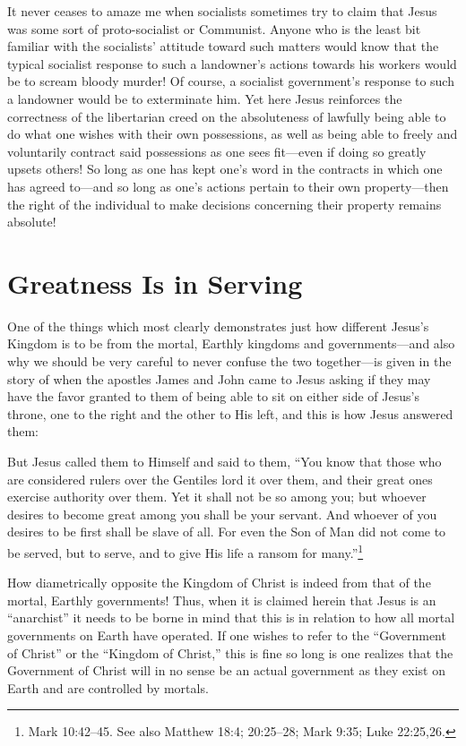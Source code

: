 \documentclass[letterpaper,12pt]{article}
\newenvironment{squote}
  {\small\quote}
  {\endquote\normalsize}
\begin{document}
It never ceases to amaze me when socialists sometimes try to claim that Jesus was some sort of proto-socialist or Communist. Anyone who is the least bit familiar with the socialists' attitude toward such matters would know that the typical socialist response to such a landowner's actions towards his workers would be to scream bloody murder! Of course, a socialist government's response to such a landowner would be to exterminate him. Yet here Jesus reinforces the correctness of the libertarian creed on the absoluteness of lawfully being able to do what one wishes with their own possessions, as well as being able to freely and voluntarily contract said possessions as one sees fit---even if doing so greatly upsets others! So long as one has kept one's word in the contracts in which one has agreed to---and so long as one's actions pertain to their own property---then the right of the individual to make decisions concerning their property remains absolute!

\section{Greatness Is in Serving}
\label{sec:GreatnessIsInServing}

One of the things which most clearly demonstrates just how different Jesus's Kingdom is to be from the mortal, Earthly kingdoms and governments---and also why we should be very careful to never confuse the two together---is given in the story of when the apostles James and John came to Jesus asking if they may have the favor granted to them of being able to sit on either side of Jesus's throne, one to the right and the other to His left, and this is how Jesus answered them:

\begin{squote}
But Jesus called them to Himself and said to them, ``You know that those who are considered rulers over the Gentiles lord it over them, and their great ones exercise authority over them. Yet it shall not be so among you; but whoever desires to become great among you shall be your servant. And whoever of you desires to be first shall be slave of all. For even the Son of Man did not come to be served, but to serve, and to give His life a ransom for many.''\footnote{Mark 10:42--45. See also Matthew 18:4; 20:25--28; Mark 9:35; Luke 22:25,26.}
\end{squote}

How diametrically opposite the Kingdom of Christ is indeed from that of the mortal, Earthly governments! Thus, when it is claimed herein that Jesus is an ``anarchist'' it needs to be borne in mind that this is in relation to how all mortal governments on Earth have operated. If one wishes to refer to the ``Government of Christ'' or the ``Kingdom of Christ,'' this is fine so long is one realizes that the Government of Christ will in no sense be an actual government as they exist on Earth and are controlled by mortals.
\end{document}
